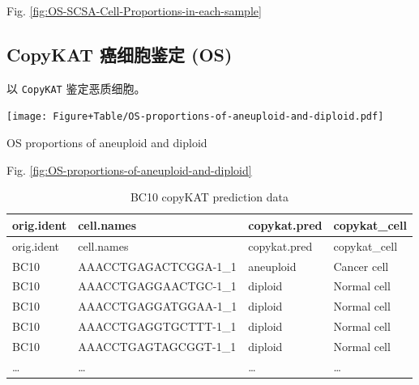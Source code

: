 \documentclass[
]{article}
\begin{document}
\begin{center}\vspace{1.5cm}\end{center}

Fig. \ref{fig:OS-SCSA-Cell-Proportions-in-each-sample}

\hypertarget{copykat-ux764cux7ec6ux80deux9274ux5b9a-os}{%
\subsection{CopyKAT 癌细胞鉴定 (OS)}\label{copykat-ux764cux7ec6ux80deux9274ux5b9a-os}}

以 \texttt{CopyKAT} 鉴定恶质细胞。

\begin{center}\vspace{1.5cm}\end{center}
\def\@captype{figure}
\begin{center}
\texttt{[image: Figure+Table/OS-proportions-of-aneuploid-and-diploid.pdf]}
\caption{OS proportions of aneuploid and diploid}\label{fig:OS-proportions-of-aneuploid-and-diploid}
\end{center}

\begin{center}\vspace{1.5cm}\end{center}

Fig. \ref{fig:OS-proportions-of-aneuploid-and-diploid}

\begin{center}\vspace{1.5cm}\end{center}

\begin{longtable}[]{@{}llll@{}}
\caption{\label{tab:BC10-copyKAT-prediction-data}BC10 copyKAT prediction data}\tabularnewline
\toprule
orig.ident & cell.names & copykat.pred & copykat\_cell\tabularnewline
\midrule
\endfirsthead
\toprule
orig.ident & cell.names & copykat.pred & copykat\_cell\tabularnewline
\midrule
\endhead
BC10 & AAACCTGAGACTCGGA-1\_1 & aneuploid & Cancer cell\tabularnewline
BC10 & AAACCTGAGGAACTGC-1\_1 & diploid & Normal cell\tabularnewline
BC10 & AAACCTGAGGATGGAA-1\_1 & diploid & Normal cell\tabularnewline
BC10 & AAACCTGAGGTGCTTT-1\_1 & diploid & Normal cell\tabularnewline
BC10 & AAACCTGAGTAGCGGT-1\_1 & diploid & Normal cell\tabularnewline
\ldots{} & \ldots{} & \ldots{} & \ldots{}\tabularnewline
\bottomrule
\end{longtable}
\end{document}
